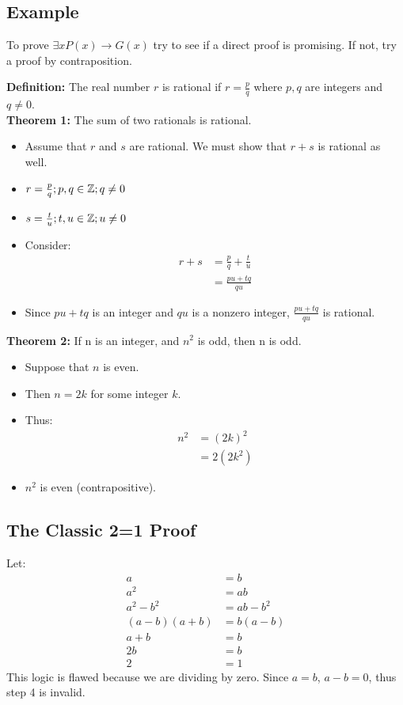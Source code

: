\documentclass[letterpaper, 12pt]{math}
\begin{document}
\subsection*{Example}
To prove \( \exists{x}P(x) \to G(x) \) try to see if a direct proof is
promising. If not, try a proof by contraposition. \par
\textbf{Definition:} The real number \( r \) is rational if \( r = \frac{p}{q}
\) where \( p,q \) are integers and \( q \neq 0 \). \\
\textbf{Theorem 1:} The sum of two rationals is rational.
\begin{itemize}
  \item Assume that \( r \) and \( s \) are rational. We must show that
    \( r+s \) is rational as well.
  \item \( r = \frac{p}{q}; p,q \in \mathbb{Z}; q \neq 0 \)
  \item \( s = \frac{t}{u}; t,u \in \mathbb{Z}; u \neq 0 \)
  \item Consider:
    \begin{align*}
      r+s &= \frac{p}{q}+\frac{t}{u} \\
      &= \frac{pu+tq}{qu}
    \end{align*}
  \item Since \( pu+tq \) is an integer and \( qu \) is a nonzero integer,
    \( \frac{pu+tq}{qu} \) is rational.
\end{itemize}
\textbf{Theorem 2:} If n is an integer, and \( n^{2} \) is odd, then n is odd.
\begin{itemize}
  \item Suppose that \( n \) is even.
  \item Then \( n =2k \) for some integer \( k \).
  \item Thus:
    \begin{align*}
      n^{2} &= (2k)^{2} \\
      &= 2(2k^{2})
    \end{align*}
  \item \( n^{2} \) is even (contrapositive).
\end{itemize}

\subsection*{The Classic 2=1 Proof}
Let:
\begin{align*}
  a &= b \\
  a^{2} &= ab \\
  a^{2}-b^{2} &= ab-b^{2} \\
  (a-b)(a+b) &= b(a-b) \\
  a+b &= b \\
  2b &= b \\
  2 &= 1
\end{align*}
This logic is flawed because we are dividing by zero. Since \( a = b \),
\( a-b = 0 \), thus step 4 is invalid.
\end{document}
